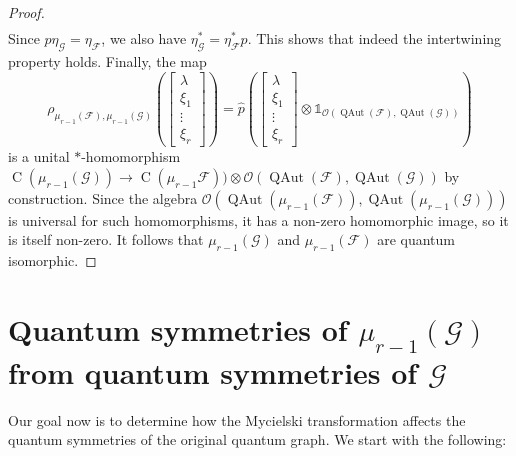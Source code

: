\documentclass[11pt,reqno]{amsart}
\newcommand{\I}{\mathds{1}}
\newcommand{\tens}{\otimes}
\DeclareMathOperator{\QAut}{QAut}
\DeclareMathOperator{\C}{C}
\begin{document}
\begin{proof}
\begin{align*}
\end{align*}
Since $p\eta_{\scriptscriptstyle\mathcal{G}}=\eta_{\scriptscriptstyle\mathcal{F}}$, we also have $\eta_{\scriptscriptstyle\mathcal{G}}^*=\eta_{\scriptscriptstyle\mathcal{F}}^* p$. This shows that indeed the intertwining property holds. Finally, the map
\[
\rho_{\scriptscriptstyle\mu_{r-1}(\mathcal{F}),\mu_{r-1}(\mathcal{G})}
\left(\left[\begin{smallmatrix}
\lambda\\\xi_1\\[-3pt]\vdots\\[1pt]\xi_r
\end{smallmatrix}\right]\right)
=\widehat{p}
\left(\left[\begin{smallmatrix}
\lambda\\\xi_1\\[-3pt]\vdots\\[1pt]\xi_r
\end{smallmatrix}\right]\tens\I_{\mathcal{O}(\QAut(\mathcal{F}),\QAut(\mathcal{G}))}\right)
\]
is a unital $*$-homomorphism $\C(\mu_{r-1}(\mathcal{G}))\to
\C(\mu_{r-1}\mathcal{F}))\tens\mathcal{O}(\QAut(\mathcal{F}),\QAut(\mathcal{G}))$ 
by construction. Since the algebra $\mathcal{O}(\QAut(\mu_{r-1}(\mathcal{F})),\QAut(\mu_{r-1}(\mathcal{G})))$ is universal for such homomorphisms, it has a non-zero homomorphic image, so it is itself non-zero. It follows that $\mu_{r-1}(\mathcal{G})$ and $\mu_{r-1}(\mathcal{F})$ are quantum isomorphic.
\end{proof}

\section{Quantum symmetries of \texorpdfstring{$\mu_{r-1}(\mathcal{G})$}{mr(G)} from quantum symmetries of \texorpdfstring{$\mathcal{G}$}{G}}\label{sec:symm}

Our goal now is to determine how the Mycielski transformation affects the quantum symmetries of the original quantum graph. We start with the following:
\end{document}
